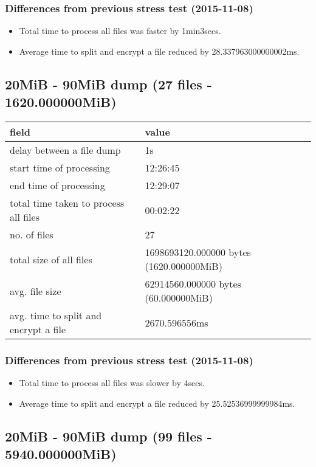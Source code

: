 \subsubsection{Differences from previous stress test (2015-11-08)}

\begin{itemize}
\item Total time to process all files was faster by 1min3secs.
\item Average time to split and encrypt a file reduced by
  28.337963000000002ms.
\end{itemize}

\subsection{20MiB - 90MiB dump (27 files - 1620.000000MiB)}\label{5-st-1620}

\begin{center}
\begin{tabular}{ll}
field & value\\
\hline
delay between a file dump & 1s\\
start time of processing & 12:26:45\\
end time of processing & 12:29:07\\
total time taken to process all files & 00:02:22\\
no. of files & 27\\
total size of all files & 1698693120.000000 bytes (1620.000000MiB)\\
avg. file size & 62914560.000000 bytes (60.000000MiB)\\
avg. time to split and encrypt a file & 2670.596556ms\\
\end{tabular}
\end{center}

\subsubsection{Differences from previous stress test (2015-11-08)}

\begin{itemize}
\item Total time to process all files was slower by 4secs.
\item Average time to split and encrypt a file reduced by
   25.52536999999984ms.
\end{itemize}

\subsection{20MiB - 90MiB dump (99 files - 5940.000000MiB)}\label{5-st-5940}

